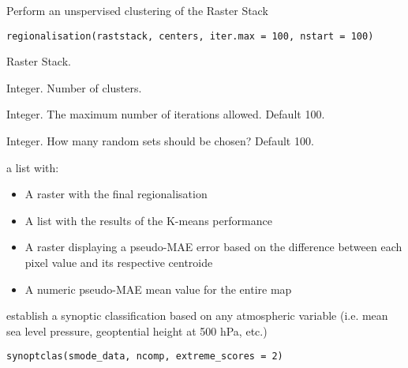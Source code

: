 \documentclass[a4paper]{book}
\begin{document}
%
\begin{Description}\relax
Perform an unspervised clustering of the Raster Stack
\end{Description}
%
\begin{Usage}
\begin{verbatim}
regionalisation(raststack, centers, iter.max = 100, nstart = 100)
\end{verbatim}
\end{Usage}
%
\begin{Arguments}
\begin{ldescription}
\item[\code{raststack}] Raster Stack.

\item[\code{centers}] Integer. Number of clusters.

\item[\code{iter.max}] Integer. The maximum number of iterations allowed. Default 100.

\item[\code{nstart}] Integer. How many random sets should be chosen? Default 100.
\end{ldescription}
\end{Arguments}
%
\begin{Value}
a list with: \begin{itemize}

\item A raster with the final regionalisation 
\item A list with the results of the K-means performance
\item A raster displaying a pseudo-MAE error based on the difference between each pixel value and its respective centroide
\item A numeric pseudo-MAE mean value for the entire map

\end{itemize}

\end{Value}
%
\begin{Description}\relax
{} establish a synoptic classification based on any atmospheric variable (i.e. mean sea level pressure, geoptential height at 500 hPa, etc.)
\end{Description}
%
\begin{Usage}
\begin{verbatim}
synoptclas(smode_data, ncomp, extreme_scores = 2)
\end{verbatim}
\end{Usage}
\end{document}
